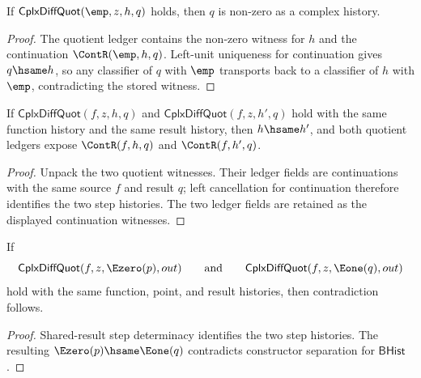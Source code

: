 \begin{theorem}
\label{thm:cplx-diff-quot-empty-function-result-nonzero}
If \(\mathsf{CplxDiffQuot}(\emp,z,h,q)\) holds, then \(q\) is non-zero as a
complex history.
\end{theorem}
\begin{proof}
The quotient ledger contains the non-zero witness for \(h\) and the
continuation \(\ContR(\emp,h,q)\). Left-unit uniqueness for continuation gives
\(q\hsame h\), so any classifier of \(q\) with \(\emp\) transports back to a
classifier of \(h\) with \(\emp\), contradicting the stored witness.
\end{proof}

\begin{theorem}
\label{thm:cplx-diff-quot-same-result-step-deterministic}
If \(\mathsf{CplxDiffQuot}(f,z,h,q)\) and
\(\mathsf{CplxDiffQuot}(f,z,h',q)\) hold with the same function history and
the same result history, then \(h\hsame h'\), and both quotient ledgers expose
\(\ContR(f,h,q)\) and \(\ContR(f,h',q)\).
\end{theorem}
\begin{proof}
Unpack the two quotient witnesses. Their ledger fields are continuations with
the same source \(f\) and result \(q\); left cancellation for continuation
therefore identifies the two step histories. The two ledger fields are retained
as the displayed continuation witnesses.
\end{proof}

\begin{theorem}
\label{thm:cplx-diff-quot-visible-step-same-result-absurd}
If
$$
\mathsf{CplxDiffQuot}(f,z,\Ezero(p),out)
\qquad\text{and}\qquad
\mathsf{CplxDiffQuot}(f,z,\Eone(q),out)
$$
hold with the same function, point, and result histories, then contradiction
follows.
\end{theorem}
\begin{proof}
Shared-result step determinacy identifies the two step histories. The resulting
$\Ezero(p)\hsame\Eone(q)$ contradicts constructor separation for
$\mathsf{BHist}$.
\end{proof}

